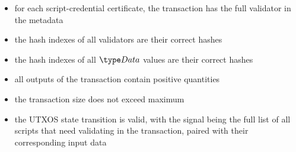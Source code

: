 \begin{itemize}
  \item for each script-credential certificate, the transaction
  has the full validator in the metadata

  \item the hash indexes of all validators are their correct hashes

  \item the hash indexes of all $\Data$ values are their correct hashes

  \item all outputs of the transaction contain positive quantities

  \item the transaction size does not exceed maximum

  \item the UTXOS state transition is valid, with the signal being
  the full list of all scripts that need validating in the transaction, paired with
  their corresponding input data
\end{itemize}



